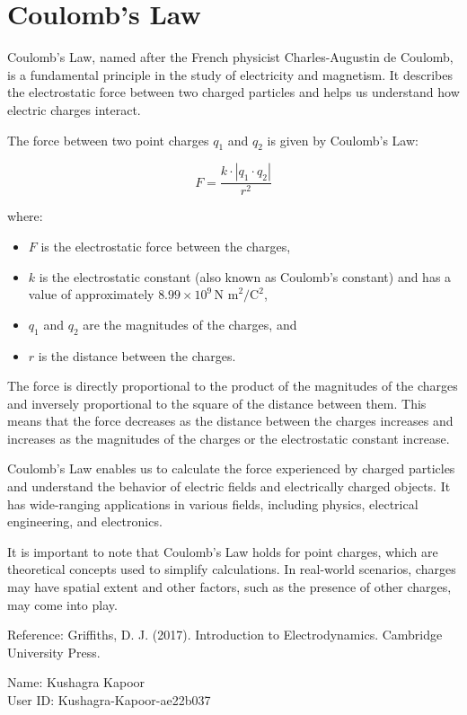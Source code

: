 \documentclass{article}
\begin{document}
\section{Coulomb's Law}

Coulomb's Law, named after the French physicist Charles-Augustin de Coulomb, is a fundamental principle in the study of electricity and magnetism. It describes the electrostatic force between two charged particles and helps us understand how electric charges interact.

The force between two point charges $q_1$ and $q_2$ is given by Coulomb's Law:

\[
F = \frac{{k \cdot |q_1 \cdot q_2|}}{{r^2}}
\]

where:
\begin{itemize}
  \item $F$ is the electrostatic force between the charges,
  \item $k$ is the electrostatic constant (also known as Coulomb's constant) and has a value of approximately $8.99 \times 10^9 \, \text{N m}^2/\text{C}^2$,
  \item $q_1$ and $q_2$ are the magnitudes of the charges, and
  \item $r$ is the distance between the charges.
\end{itemize}

The force is directly proportional to the product of the magnitudes of the charges and inversely proportional to the square of the distance between them. This means that the force decreases as the distance between the charges increases and increases as the magnitudes of the charges or the electrostatic constant increase.

Coulomb's Law enables us to calculate the force experienced by charged particles and understand the behavior of electric fields and electrically charged objects. It has wide-ranging applications in various fields, including physics, electrical engineering, and electronics.

It is important to note that Coulomb's Law holds for point charges, which are theoretical concepts used to simplify calculations. In real-world scenarios, charges may have spatial extent and other factors, such as the presence of other charges, may come into play.

Reference: Griffiths, D. J. (2017). Introduction to Electrodynamics. Cambridge University Press.

Name: Kushagra Kapoor \\
User ID: Kushagra-Kapoor-ae22b037
\end{document}
